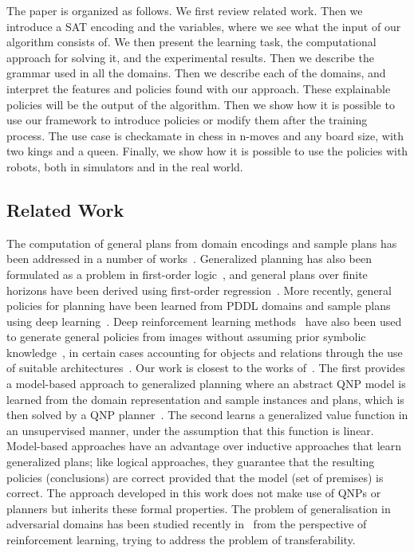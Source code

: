 \documentclass[a4paper]{article}
\begin{document}
The paper is organized as follows. We first review related work. Then we introduce a SAT encoding and the variables, where we see what the input of our algorithm consists of. We then present the learning task, the computational approach for solving it, and the experimental results. Then we describe the grammar used in all the domains. Then we describe each of the domains, and interpret the features and policies found with our approach. These explainable policies will be the output of the algorithm. Then we show how it is possible to use our framework to introduce policies or modify them after the training process. The use case is checkamate in chess in n-moves and any board size, with two kings and a queen. Finally, we show how it is possible to use the policies with robots, both in simulators and in the real world.

\subsection{Related Work}


The computation of general plans from domain encodings and sample plans has been addressed in a number of works~\cite{cui2019stochastic, fern2003approximate, silver2020pddlgym}. Generalized planning has also been formulated as a problem in first-order logic~\cite{srivastava2011environment, on2019symbolic}, and general plans over finite horizons have been derived using first-order regression~\cite{boutilier2001symbolic, wang2008first, sanner2009practical}. More recently, general policies for planning have been learned from PDDL domains and sample plans using deep learning~\cite{toyer2018action, gargmausam}. Deep reinforcement learning methods~\cite{mnih2015human} have also been used to generate general policies from images without assuming prior symbolic knowledge~\cite{groshev2018learning,hui2020babyai}, in certain cases accounting for objects and relations through the use of suitable architectures~\cite{garnelo2019reconciling}. Our work  is closest to the works of~\cite{frances2021learning}. The first provides a model-based approach to generalized planning where an abstract QNP model is learned from the domain representation and sample instances and plans, which is then solved by a QNP planner~\cite{bonet2020general}. The second learns a generalized value function in an unsupervised manner, under the assumption that this function is linear. Model-based approaches have an advantage over inductive approaches that learn generalized plans; like logical approaches, they guarantee that the resulting policies (conclusions) are correct provided that the model (set of premises) is correct. The approach developed in this work does not make use of QNPs or planners but inherits these formal properties. The problem of generalisation in adversarial domains has been studied recently in~\cite{zhang2021understanding, subramani2020learning} from the perspective of reinforcement learning, trying to address the problem of transferability.
\end{document}
